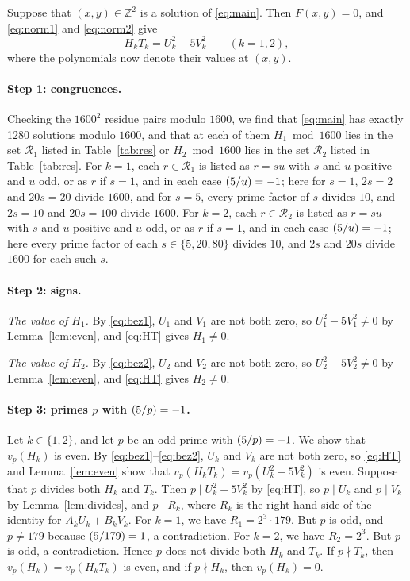 \documentclass[11pt]{article}
\newcommand{\Z}{\mathbb{Z}}
\newcommand{\leg}[2]{\mathchoice{\biggl(\dfrac{#1}{#2}\biggr)}{(#1/#2)}{(#1/#2)}{(#1/#2)}}
\begin{document}
Suppose that $(x,y)\in\Z^2$ is a solution of \eqref{eq:main}. Then $F(x,y)=0$, and \eqref{eq:norm1} and \eqref{eq:norm2} give
\begin{equation}\label{eq:HT}
H_kT_k=U_k^2-5V_k^2\qquad(k=1,2),
\end{equation}
where the polynomials now denote their values at $(x,y)$.

\paragraph{Step 1: congruences.} Checking the $1600^2$ residue pairs modulo $1600$, we find that \eqref{eq:main} has exactly 1280 solutions modulo $1600$, and that at each of them $H_{1}\bmod 1600$ lies in the set $\mathcal R_{1}$ listed in Table~\ref{tab:res} or $H_{2}\bmod 1600$ lies in the set $\mathcal R_{2}$ listed in Table~\ref{tab:res}. For $k=1$, each $r\in\mathcal R_{1}$ is listed as $r=su$ with $s$ and $u$ positive and $u$ odd, or as $r$ if $s=1$, and in each case $\leg{5}{u}=-1$; here for $s=1$, $2s=2$ and $20s=20$ divide $1600$, and for $s=5$, every prime factor of $s$ divides $10$, and $2s=10$ and $20s=100$ divide $1600$. For $k=2$, each $r\in\mathcal R_{2}$ is listed as $r=su$ with $s$ and $u$ positive and $u$ odd, or as $r$ if $s=1$, and in each case $\leg{5}{u}=-1$; here every prime factor of each $s\in\{5,20,80\}$ divides $10$, and $2s$ and $20s$ divide $1600$ for each such $s$.

\paragraph{Step 2: signs.} \emph{The value of $H_{1}$.} By \eqref{eq:bez1}, $U_{1}$ and $V_{1}$ are not both zero, so $U_{1}^2-5V_{1}^2\neq0$ by Lemma~\ref{lem:even}, and \eqref{eq:HT} gives $H_{1}\neq0$.

\emph{The value of $H_{2}$.} By \eqref{eq:bez2}, $U_{2}$ and $V_{2}$ are not both zero, so $U_{2}^2-5V_{2}^2\neq0$ by Lemma~\ref{lem:even}, and \eqref{eq:HT} gives $H_{2}\neq0$.

\paragraph{Step 3: primes $p$ with $\leg{5}{p}=-1$.} Let $k\in\{1,2\}$, and let $p$ be an odd prime with $\leg{5}{p}=-1$. We show that $v_p(H_k)$ is even. By \eqref{eq:bez1}--\eqref{eq:bez2}, $U_k$ and $V_k$ are not both zero, so \eqref{eq:HT} and Lemma~\ref{lem:even} show that $v_p(H_kT_k)=v_p(U_k^2-5V_k^2)$ is even. Suppose that $p$ divides both $H_k$ and $T_k$. Then $p\mid U_k^2-5V_k^2$ by \eqref{eq:HT}, so $p\mid U_k$ and $p\mid V_k$ by Lemma~\ref{lem:divides}, and $p\mid R_k$, where $R_k$ is the right-hand side of the identity for $A_kU_k+B_kV_k$. For $k=1$, we have $R_{1}=2^{3}\cdot 179$. But $p$ is odd, and $p\neq179$ because $\leg{5}{179}=1$, a contradiction. For $k=2$, we have $R_{2}=2^{3}$. But $p$ is odd, a contradiction. Hence $p$ does not divide both $H_k$ and $T_k$. If $p\nmid T_k$, then $v_p(H_k)=v_p(H_kT_k)$ is even, and if $p\nmid H_k$, then $v_p(H_k)=0$.
\end{document}
